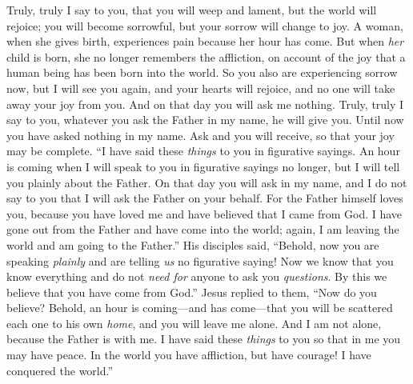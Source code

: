 \begin{biblechapter}
\verse Truly, truly I say to you, that you will weep and lament, but the world will rejoice; you will become sorrowful, but your sorrow will change to joy.
\verse A woman, when she gives birth, experiences pain because her hour has come. But when \textit{her} child is born, she no longer remembers the affliction, on account of the joy that a human being has been born into the world.
\verse So you also are experiencing sorrow now, but I will see you again, and your hearts will rejoice, and no one will take away your joy from you.
\verse And on that day you will ask me nothing. Truly, truly I say to you, whatever you ask the Father in my name, he will give you.
\verse Until now you have asked nothing in my name. Ask and you will receive, so that your joy may be complete.
 “I have said these \textit{things} to you in figurative sayings. An hour is coming when I will speak to you in figurative sayings no longer, but I will tell you plainly about the Father.
\verse On that day you will ask in my name, and I do not say to you that I will ask the Father on your behalf.
\verse For the Father himself loves you, because you have loved me and have believed that I came from God.
\verse I have gone out from the Father and have come into the world; again, I am leaving the world and am going to the Father.”
\verse His disciples said, “Behold, now you are speaking \textit{plainly} and are telling \textit{us} no figurative saying!
\verse Now we know that you know everything and do not \textit{need for} anyone to ask you \textit{questions}. By this we believe that you have come from God.”
\verse Jesus replied to them, “Now do you believe?
\verse Behold, an hour is coming—and has come—that you will be scattered each one to his own \textit{home}, and you will leave me alone. And I am not alone, because the Father is with me.
\verse I have said these \textit{things} to you so that in me you may have peace. In the world you have affliction, but have courage! I have conquered the world.”
\end{biblechapter}

